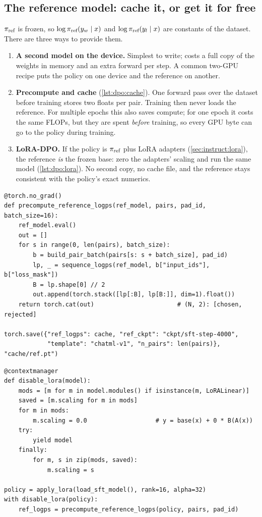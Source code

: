\subsection{The reference model: cache it, or get it for free}\label{sec:dpo:ref}

$\pi_{\text{ref}}$ is frozen, so $\log\pi_{\text{ref}}(y_w\mid x)$ and $\log\pi_{\text{ref}}(y_l\mid x)$ are constants of the
dataset. There are three ways to provide them.
\begin{enumerate}
\item \textbf{A second model on the device.} Simplest to write; costs a full copy of the weights in
  memory and an extra forward per step. A common two-GPU recipe puts the policy on one device and
  the reference on another.
\item \textbf{Precompute and cache} (\cref{lst:dpo:cache}). One forward pass over the dataset before
  training stores two floats per pair. Training then never loads the reference. For multiple
  epochs this also saves compute; for one epoch it costs the same FLOPs, but they are spent
  \emph{before} training, so every GPU byte can go to the policy during training.
\item \textbf{LoRA-DPO.} If the policy is $\pi_{\text{ref}}$ plus LoRA adapters (\cref{sec:instruct:lora}),
  the reference \emph{is} the frozen base: zero the adapters' scaling and run the same model
  (\cref{lst:dpo:lora}). No second copy, no cache file, and the reference stays consistent with the
  policy's exact numerics.
\end{enumerate}

\begin{lstlisting}[caption={Caching reference log-probs (abridged). The optional third column stores KTO's mismatched-pair term (\cref{sec:dpo:family}).},label={lst:dpo:cache}]
@torch.no_grad()
def precompute_reference_logps(ref_model, pairs, pad_id, batch_size=16):
    ref_model.eval()
    out = []
    for s in range(0, len(pairs), batch_size):
        b = build_pair_batch(pairs[s: s + batch_size], pad_id)
        lp, _ = sequence_logps(ref_model, b["input_ids"], b["loss_mask"])
        B = lp.shape[0] // 2
        out.append(torch.stack([lp[:B], lp[B:]], dim=1).float())
    return torch.cat(out)                       # (N, 2): [chosen, rejected]

torch.save({"ref_logps": cache, "ref_ckpt": "ckpt/sft-step-4000",
            "template": "chatml-v1", "n_pairs": len(pairs)}, "cache/ref.pt")
\end{lstlisting}

\begin{lstlisting}[caption={LoRA-DPO: the base weights are the reference model.},label={lst:dpo:lora}]
@contextmanager
def disable_lora(model):
    mods = [m for m in model.modules() if isinstance(m, LoRALinear)]
    saved = [m.scaling for m in mods]
    for m in mods:
        m.scaling = 0.0                   # y = base(x) + 0 * B(A(x))
    try:
        yield model
    finally:
        for m, s in zip(mods, saved):
            m.scaling = s

policy = apply_lora(load_sft_model(), rank=16, alpha=32)
with disable_lora(policy):
    ref_logps = precompute_reference_logps(policy, pairs, pad_id)
\end{lstlisting}

